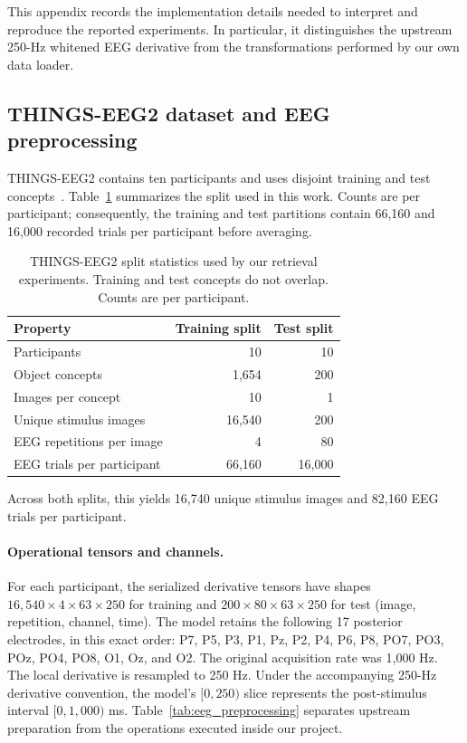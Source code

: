 \documentclass{article}
\begin{document}
This appendix records the implementation details needed to interpret and
reproduce the reported experiments. In particular, it distinguishes the
upstream 250-Hz whitened EEG derivative from the transformations performed by
our own data loader.

\subsection{THINGS-EEG2 dataset and EEG preprocessing}
\label{app:data_preprocessing}

THINGS-EEG2 contains ten participants and uses disjoint training and test
concepts~\citep{gifford2022things}. Table~\ref{tab:dataset_details} summarizes
the split used in this work. Counts are per participant; consequently, the
training and test partitions contain 66,160 and 16,000 recorded trials per
participant before averaging.

\begin{table}[h]
  \centering
  \caption{THINGS-EEG2 split statistics used by our retrieval experiments.
  Training and test concepts do not overlap. Counts are per participant.}
  \label{tab:dataset_details}
  \setlength{\tabcolsep}{7pt}
  \begin{tabular}{lrr}
    \toprule
    Property & Training split & Test split \\
    \midrule
    Participants & 10 & 10 \\
    Object concepts & 1,654 & 200 \\
    Images per concept & 10 & 1 \\
    Unique stimulus images & 16,540 & 200 \\
    EEG repetitions per image & 4 & 80 \\
    EEG trials per participant & 66,160 & 16,000 \\
    \bottomrule
  \end{tabular}
\end{table}

Across both splits, this yields 16,740 unique stimulus images and 82,160 EEG
trials per participant.

\paragraph{Operational tensors and channels.}
For each participant, the serialized derivative tensors have shapes
$16{,}540\times4\times63\times250$ for training and
$200\times80\times63\times250$ for test (image, repetition, channel, time).
The model retains the following 17 posterior electrodes, in this exact order:
P7, P5, P3, P1, Pz, P2, P4, P6, P8, PO7, PO3, POz, PO4, PO8, O1, Oz, and O2.
The original acquisition rate was 1,000 Hz. The local derivative is resampled
to 250 Hz. Under the accompanying 250-Hz derivative convention, the model's
$[0,250)$ slice represents the post-stimulus interval $[0,1{,}000)$ ms.
Table~\ref{tab:eeg_preprocessing} separates upstream preparation from the
operations executed inside our project.
\end{document}
